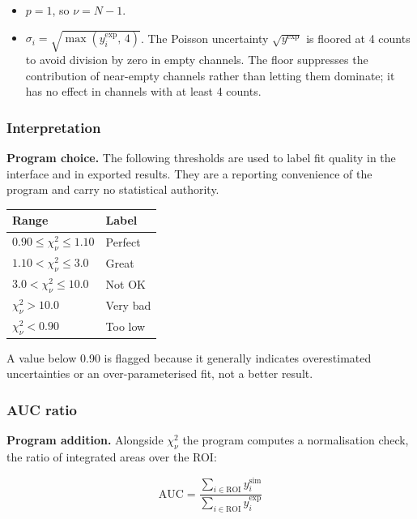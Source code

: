 \begin{itemize}
\tightlist
\item
  \(p = 1\), so \(\nu = N - 1\).
\item
  \(\sigma_i = \sqrt{\max\left(y_i^{\exp},\, 4\right)}\). The Poisson
  uncertainty \(\sqrt{y^{\exp}}\) is floored at 4 counts to avoid
  division by zero in empty channels. The floor suppresses the
  contribution of near-empty channels rather than letting them dominate;
  it has no effect in channels with at least 4 counts.
\end{itemize}

\subsubsection{Interpretation}\label{interpretation}

\textbf{Program choice.} The following thresholds are used to label fit
quality in the interface and in exported results. They are a reporting
convenience of the program and carry no statistical authority.

{\def\LTcaptype{none} %
\begin{longtable}[]{@{}ll@{}}
\toprule\noalign{}
Range & Label \\
\midrule\noalign{}
\endhead
\bottomrule\noalign{}
\endlastfoot
\(0.90 \le \chi^2_\nu \le 1.10\) & Perfect \\
\(1.10 < \chi^2_\nu \le 3.0\) & Great \\
\(3.0 < \chi^2_\nu \le 10.0\) & Not OK \\
\(\chi^2_\nu > 10.0\) & Very bad \\
\(\chi^2_\nu < 0.90\) & Too low \\
\end{longtable}
}

A value below 0.90 is flagged because it generally indicates
overestimated uncertainties or an over-parameterised fit, not a better
result.

\subsubsection{AUC ratio}\label{auc-ratio}

\textbf{Program addition.} Alongside \(\chi^2_\nu\) the program computes
a normalisation check, the ratio of integrated areas over the ROI:

\[
\mathrm{AUC} = \frac{\sum_{i \in \text{ROI}} y_i^{\mathrm{sim}}}{\sum_{i \in \text{ROI}} y_i^{\exp}}
\]

